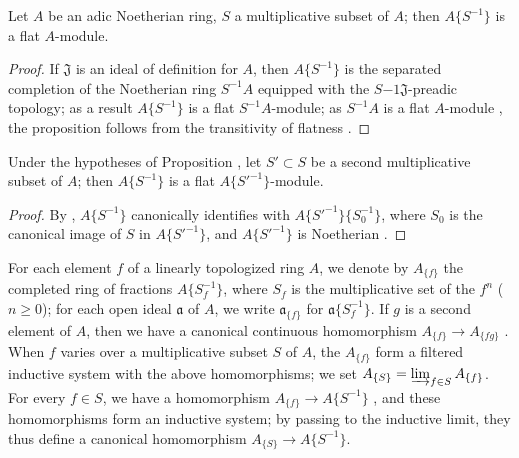 \begin{proposition}[7.6.13]
\label{0.7.6.13}
Let $A$ be an adic Noetherian ring, $S$ a multiplicative subset of $A$; then $A\{S^{-1}\}$ is a
flat $A$-module.
\end{proposition}

\begin{proof}
\label{proof-0.7.6.13}
If $\mathfrak{J}$ is an ideal of definition for $A$, then $A\{S^{-1}\}$ is the separated completion
of the Noetherian ring $S^{-1}A$ equipped with the $S{-1}\mathfrak{J}$-preadic topology; as a result
 $A\{S^{-1}\}$ is a flat $S^{-1}A$-module; as $S^{-1}A$ is a flat
$A$-module , the proposition follows from the transitivity of flatness .
\end{proof}

\begin{corollary}[7.6.14]
\label{0.7.6.14}
Under the hypotheses of Proposition , let $S'\subset S$ be a second
multiplicative subset of $A$; then $A\{S^{-1}\}$ is a flat $A\{{S'}^{-1}\}$-module.
\end{corollary}

\begin{proof}
\label{proof-0.7.6.14}
By , $A\{S^{-1}\}$ canonically identifies with
$A\{{S'}^{-1}\}\{S_0^{-1}\}$, where $S_0$ is the canonical image of $S$ in $A\{{S'}^{-1}\}$, and
$A\{{S'}^{-1}\}$ is Noetherian .
\end{proof}

\begin{env}[7.6.15]
\label{0.7.6.15}
For each element $f$ of a linearly topologized ring $A$, we denote by $A_{\{f\}}$ the completed
ring of fractions $A\{S_f^{-1}\}$, where $S_f$ is the multiplicative set of the $f^n$
($n\geq 0$); for each open ideal $\mathfrak{a}$ of $A$, we write $\mathfrak{a}_{\{f\}}$ for
$\mathfrak{a}\{S_f^{-1}\}$. If $g$ is a second element of $A$, then we have a canonical continuous
homomorphism $A_{\{f\}}\to A_{\{fg\}}$ . When $f$ varies over a
multiplicative subset $S$ of $A$, the $A_{\{f\}}$ form a filtered inductive system with the above
homomorphisms; we set $A_{\{S\}}=\varinjlim_{f\in S}A_{\{f\}}$. For every $f\in S$, we have a
homomorphism $A_{\{f\}}\to A\{S^{-1}\}$ , and
these homomorphisms form an inductive system; by passing to the inductive limit, they thus define
a canonical homomorphism $A_{\{S\}}\to A\{S^{-1}\}$.
\end{env}

